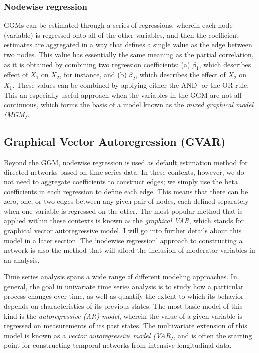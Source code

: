 \subsubsection{Nodewise regression}
GGMs can be estimated through a series of regressions, wherein each node (variable) is regressed onto all of the other variables, and then the coefficient estimates are aggregated in a way that defines a single value as the edge between two nodes. This value has essentially the same meaning as the partial correlation, as it is obtained by combining two regression coefficients: (a) $\beta_1$, which describes effect of $X_1$ on $X_2$, for instance, and (b) $\beta_2$, which describes the effect of $X_2$ on $X_1$. These values can be combined by applying either the AND- or the OR-rule. This an especially useful approach when the variables in the GGM are not all continuous, which forms the basis of a model known as the \textit{mixed graphical model (MGM)}. 

\subsection{Graphical Vector Autoregression (GVAR)}
Beyond the GGM, nodewise regression is used as default estimation method for directed networks based on time series data. In these contexts, however, we do not need to aggregate coefficients to construct edges; we simply use the beta coefficients in each regression to define each edge. This means that there can be zero, one, or two edges between any given pair of nodes, each defined separately when one variable is regressed on the other. The most popular method that is applied within these contexts is known as the \textit{graphical VAR}, which stands for graphical vector autoregressive model. I will go into further details about this model in a later section. The `nodewise regression' approach to constructing a network is also the method that will afford the inclusion of moderator variables in an analysis.

Time series analysis spans a wide range of different modeling approaches. In general, the goal in univariate time series analysis is to study how a particular process changes over time, as well as quantify the extent to which its behavior depends on characteristics of its previous states. The most basic model of this kind is the \textit{autoregressive (AR) model}, wherein the value of a given variable is regressed on measurements of its past states. The multivariate extension of this model is known as a \textit{vector autoregressive model (VAR)}, and is often the starting point for constructing temporal networks from intensive longitudinal data.

